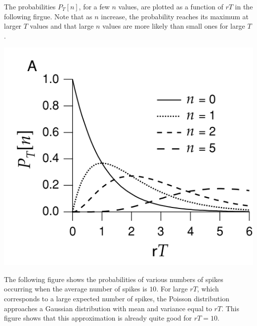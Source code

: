 \begin{exm}
    The probabilities $P_T[n]$, for a few $n$ values, are plotted as a function of $rT$ in the following firgue. Note that as $n$ increase, the probability reaches its maximum at larger $T$ values and that large $n$ values are more likely than small ones for large $T$.
\end{exm}    

\begin{center}
    \label{fig:1.11}                
        \includegraphics[scale = 0.36]{png/Figure1-11-A}\\        
\end{center}

\begin{exm}
    The following figure shows the probabilities of various numbers of spikes occurring when the average number of spikes is $10$. For large $rT$, which corresponds to a large expected number of spikes, the Poisson distribution approaches a Gaussian distribution with mean and variance equal to $rT$. This figure shows that this approximation is already quite good for $rT = 10$.
\end{exm}    

